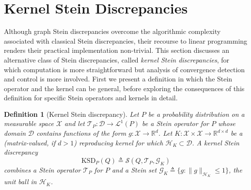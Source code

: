 \documentclass[12pt,paper=letter]{scrreprt}
\newtheorem{definition}{Definition}[chapter]
\def\defeq{\triangleq} %
\begin{document}
\section{Kernel Stein Discrepancies}
\label{sec: ksds}

Although graph Stein discrepancies overcome the algorithmic complexity associated with classical Stein discrepancies, their recourse to linear programming renders their practical implementation non-trivial.
This section discusses an alternative class of Stein discrepancies, called \emph{kernel Stein discrepancies}, for which computation is more straightforward but analysis of convergence detection and control is more involved.
First we present a definition in which the Stein operator and the kernel can be general, before exploring the consequences of this definition for specific Stein operators and kernels in detail.

\begin{definition}[Kernel Stein discrepancy] \label{def:kernel_stein_discrepancy}
Let $P$ be a probability distribution on a measurable space $\mathcal{X}$ and let $\mathcal{T}_P : \mathcal{D} \rightarrow \mathcal{L}^1(P)$ be a Stein operator for $P$ whose domain $\mathcal{D}$ contains functions of the form $g : \mathcal{X} \rightarrow \mathbb{R}^d$.
Let $K : \mathcal{X} \times \mathcal{X} \rightarrow \mathbb{R}^{d \times d}$ be a (matrix-valued, if $d > 1$) reproducing kernel for which $\mathcal{H}_K \subset \mathcal{D}$.
A \emph{kernel Stein discrepancy} 
$$
\mathrm{KSD}_P(Q) \defeq \mathcal{S}(Q,\mathcal{T}_P,\mathcal{G}_K)
$$ 
combines a Stein operator $\mathcal{T}_P$ for $P$ and a Stein set $\mathcal{G}_K \defeq  \{g : \|g\|_{\mathcal{H}_K} \leq 1\}$, the unit ball in $\mathcal{H}_K$.
\end{definition}
\end{document}
